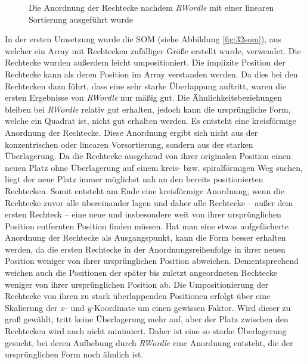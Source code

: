 \documentclass[12pt, ngerman, utf8]{article}
\begin{document}
\begin{figure}[h]
    \noindent
    \caption{Die Anordnung der Rechtecke nachdem \textit{RWordle} mit einer linearen Sortierung ausgeführt wurde}
    \label{fig:rwordle-lin}
\end{figure}
In der ersten Umsetzung wurde die SOM (siehe Abbildung \ref{fig:32som}), aus welcher ein Array mit Rechtecken zufälliger Größe erstellt wurde, verwendet. Die Rechtecke wurden außerdem leicht umpositioniert. Die implizite Position der Rechtecke kann als deren Position im Array verstanden werden. Da dies bei den Rechtecken dazu führt, dass eine sehr starke Überlappung auftritt, waren die ersten Ergebnisse von \emph{RWordle} nur mäßig gut. Die Ähnlichkeitsbeziehungen bleiben bei \emph{RWordle} relativ gut erhalten, jedoch kann die ursprüngliche Form, welche ein Quadrat ist, nicht gut erhalten werden. Es entsteht eine kreisförmige Anordnung der Rechtecke. Diese Anordnung ergibt sich nicht aus der konzentrischen oder linearen Vorsortierung, sondern aus der starken Überlagerung. Da die Rechtecke ausgehend von ihrer originalen Position einen neuen Platz ohne Überlagerung auf einem kreis- bzw. spiralförmigen Weg suchen, liegt der neue Platz immer möglichst nah an den bereits positionierten Rechtecken. Somit entsteht am Ende eine kreisförmige Anordnung, wenn die Rechtecke zuvor alle übereinander lagen und daher alle Rechtecke -- außer dem ersten Rechteck -- eine neue und insbesondere weit von ihrer ursprünglichen Position entfernten Position finden müssen. Hat man eine etwas aufgefächerte Anordnung der Rechtecke als Ausgangspunkt, kann die Form besser erhalten werden, da die ersten Rechtecke in der Anordnungsreihenfolge in ihrer neuen Position weniger von ihrer ursprünglichen Position abweichen. Dementsprechend weichen auch die Positionen der später bis zuletzt angeordneten Rechtecke weniger von ihrer ursprünglichen Position ab. Die Umpositionierung der Rechtecke von ihren zu stark überlappenden Positionen erfolgt über eine Skalierung der $x$- und $y$-Koordinate um einen gewissen Faktor. Wird dieser zu groß gewählt, tritt keine Überlagerung mehr auf, aber der Platz zwischen den Rechtecken wird auch nicht minimiert. Daher ist eine so starke Überlagerung gesucht, bei deren Aufhebung durch \emph{RWordle} eine Anordnung entsteht, die der ursprünglichen Form noch ähnlich ist. 
\end{document}
